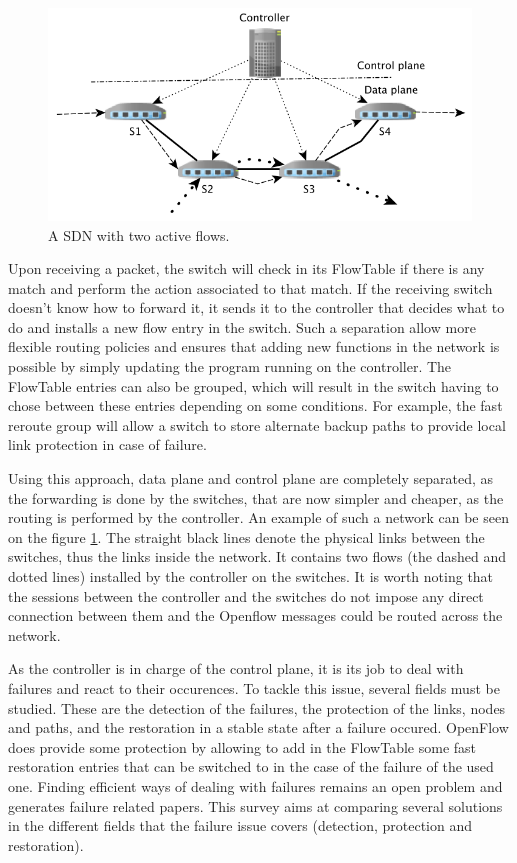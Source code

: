 \documentclass[final]{IEEEtran}
\begin{document}
\begin{figure}
	\includegraphics[width=.53\textwidth]{images/sdn.png}
	\caption{A SDN with two active flows.}
	\label{fig:sdn}
\end{figure}

Upon receiving a packet, the switch will check in its FlowTable if there is any match and perform the action associated to that match. If the receiving switch doesn't know how to forward it, it sends it to the controller that decides what to do and installs a new flow entry in the switch. Such a separation allow more flexible routing policies and ensures that adding new functions in the network is possible by simply updating the program running on the controller. The FlowTable entries can also be grouped, which will result in the switch having to chose between these entries depending on some conditions. For example, the fast reroute group will allow a switch to store alternate backup paths to provide local link protection in case of failure.

Using this approach, data plane and control plane are completely separated, as the forwarding is done by the switches, that are now simpler and cheaper, as the routing is performed by the controller. An example of such a network can be seen on the figure \ref{fig:sdn}. The straight black lines denote the physical links between the switches, thus the links inside the network. It contains two flows (the dashed and dotted lines) installed by the controller on the switches. It is worth noting that the sessions between the controller and the switches do not impose any direct connection between them and the Openflow messages could be routed across the network.

As the controller is in charge of the control plane, it is its job to deal with failures and react to their occurences. To tackle this issue, several fields must be studied. These are the detection of the failures, the protection of the links, nodes and paths, and the restoration in a stable state after a failure occured. OpenFlow does provide some protection by allowing to add in the FlowTable some fast restoration entries that can be switched to in the case of the failure of the used one. Finding efficient ways of dealing with failures remains an open problem and generates failure related papers. This survey aims at comparing several solutions in the different fields that the failure issue covers (detection, protection and restoration).
\end{document}
